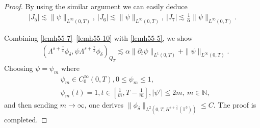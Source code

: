 \documentclass[10pt,a4paper]{amsart}
\begin{document}
\begin{proof}
				By using the similar argument we can easily deduce
				\begin{align}
					\label{lemh55-10}
					|J_{5}|\lesssim \|\psi\|_{L^{\infty}(0,T)},\ |J_{6}|\lesssim \|\psi\|_{L^{\infty}(0,T)},\ |J_{7}|\lesssim \frac{1}{\alpha}\|\psi\|_{L^{\infty}(0,T)}.
				\end{align}
				
				
				Combining \eqref{lemh55-7}--\eqref{lemh55-10} with \eqref{lemh55-5}, we show
				\begin{align}
					\label{lemh55-121}
					&
					(\Lambda^{s+\frac{\gamma}{2}}\phi_\delta,\psi\Lambda^{s+\frac{\gamma}{2}}\phi_\delta)_{Q_{T}}
					\lesssim \alpha\|\partial_t\psi\|_{L^{1}(0,T)}+\|\psi\|_{L^{\infty}(0,T)}.
				\end{align}
				Choosing  $\psi=\psi_{m}$ where
				\begin{equation}
					\label{cut-off function}
					\begin{aligned}
						& \psi_{m}\in C_{0}^{\infty}(0,T),  0\leq\psi_{m}\leq1,
						\\& \psi_{m}(t)=1, t\in\left[\frac{1}{m},T-\frac{1}{m}\right], |\psi'|\leq 2m,\ m\in \mathbb{N},
					\end{aligned}
				\end{equation}
				and then sending  $ m \to \infty $,  one derives $\|\phi_{\delta}\|_{L^{2}(0,T;H^{s+\frac{\gamma}{2}}(\mathbb{T}^{3}))}\leq C$. The proof is completed.
			\end{proof}
\end{document}
